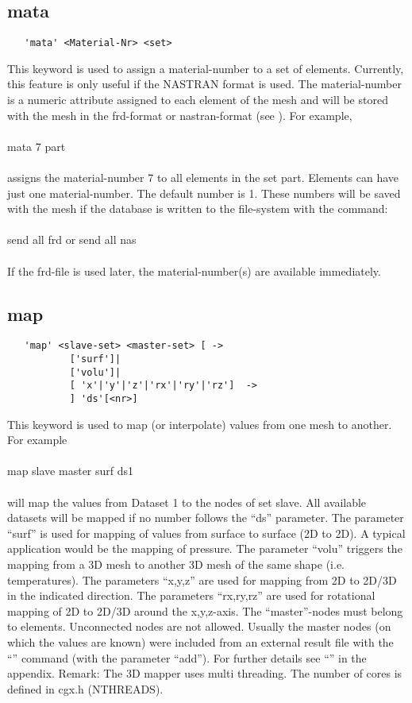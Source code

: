 \documentclass{article}
\begin{document}
\subsection{\label{mata}mata}
\begin{verbatim}
   'mata' <Material-Nr> <set> 
\end{verbatim}
This keyword is used to assign a material-number to a set of elements. Currently, this feature is only useful if the NASTRAN format is used. The material-number is a numeric attribute assigned to each element of the mesh and will be stored with the mesh in the frd-format or nastran-format (see ). For example,\\\\
mata 7 part\\\\
assigns the material-number 7 to all elements in the set part. Elements can have just one material-number. The default number is 1. These numbers will be saved with the mesh if the database is written to the file-system with the command:\\\\send all frd  or  send all nas\\\\If the frd-file is used later, the material-number(s) are available immediately.

\subsection{\label{map}map}
\begin{verbatim}
   'map' <slave-set> <master-set> [ ->
           ['surf']|
           ['volu']|
           [ 'x'|'y'|'z'|'rx'|'ry'|'rz']  ->
           ] 'ds'[<nr>]
\end{verbatim}
This keyword is used to map (or interpolate) values from one mesh to another. For example\\\\map slave master surf ds1\\\\will map the values from Dataset 1 to the nodes of set slave. All available datasets will be mapped if no number follows the ``ds'' parameter. The parameter ``surf'' is used for mapping of values from surface to surface (2D to 2D). A typical application would be the mapping of pressure. The parameter ``volu'' triggers the mapping from a 3D mesh to another 3D mesh of the same shape (i.e. temperatures). The parameters ``x,y,z'' are used for mapping from 2D to 2D/3D in the indicated direction. The parameters ``rx,ry,rz'' are used for rotational mapping of 2D to 2D/3D around the x,y,z-axis. The ``master''-nodes must belong to elements. Unconnected nodes are not allowed. Usually the master nodes (on which the values are known) were included from an external result file with the ``'' command (with the parameter ``add''). For further details see ``'' in the appendix. Remark: The 3D mapper uses multi threading. The number of cores is defined in cgx.h (NTHREADS).
\end{document}
